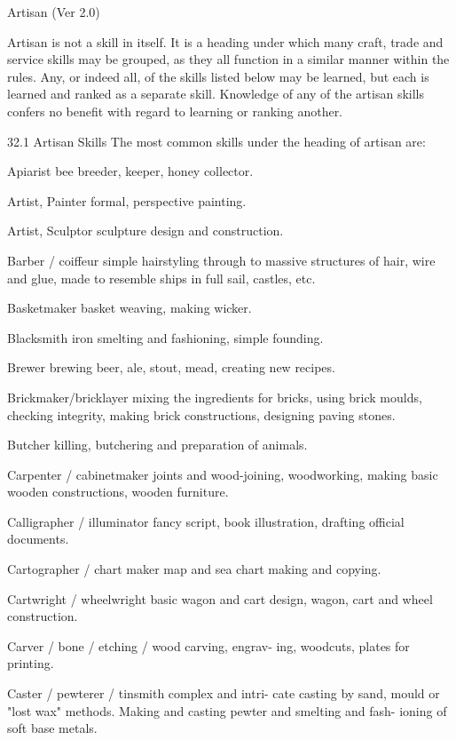 \begin{Chapter}{Artisan (Ver 2.0)}

Artisan is not a skill in itself. It is a heading under 
which  many  craft,  trade  and  service  skills  may  be 
grouped,  as  they  all  function  in  a  similar  manner 
within  the  rules.  Any,  or  indeed  all,  of  the  skills 
listed  below  may  be  learned,  but  each  is  learned 
and ranked as a separate skill. Knowledge of any of 
the  artisan  skills  confers  no  benefit  with  regard  to 
learning or ranking another. 

32.1 Artisan Skills 
The  most  common  skills  under  the  heading  of 
artisan are: 

Apiarist bee breeder, keeper, honey collector. 

Artist, Painter formal, perspective painting. 

Artist, Sculptor sculpture design and construction. 

Barber  /  coiffeur  simple  hairstyling  through  to 
massive  structures  of  hair,  wire  and  glue,  made  to 
resemble ships in full sail, castles, etc. 

Basketmaker basket weaving, making wicker. 

Blacksmith  iron  smelting  and  fashioning,  simple 
founding.  

Brewer  brewing  beer,  ale,  stout,  mead,  creating 
new recipes. 

Brickmaker/bricklayer  mixing  the  ingredients  for 
bricks,  using  brick  moulds,  checking  integrity, 
making  brick  constructions,  designing  paving 
stones. 

Butcher  killing,  butchering  and  preparation  of 
animals. 

Carpenter / cabinetmaker joints and wood-joining, 
woodworking, making basic wooden constructions, 
wooden furniture. 

Calligrapher  /  illuminator  fancy  script,  book 
illustration, drafting official documents. 

Cartographer  /  chart  maker  map  and  sea  chart 
making and copying. 

Cartwright  /  wheelwright  basic  wagon  and  cart 
design, wagon, cart and wheel construction. 

Carver  /  bone  /  etching  /  wood  carving,  engrav-
ing, woodcuts, plates for printing. 

Caster  /  pewterer  /  tinsmith  complex  and  intri-
cate casting by sand, mould or "lost wax" methods. 
Making and casting pewter and smelting and fash-
ioning of soft base metals. 


\end{Chapter}
